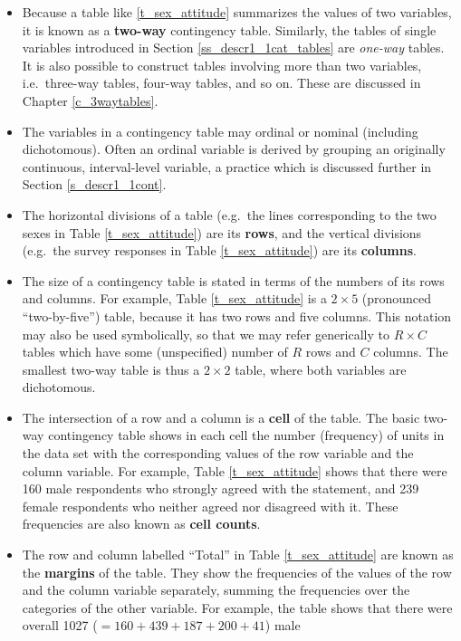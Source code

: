 \begin{itemize}
\item
Because a table like \ref{t_sex_attitude}
summarizes the values of two variables, it is known as a
\textbf{two-way} contingency table.
Similarly, the tables of single variables
introduced in Section \ref{ss_descr1_1cat_tables} are \emph{one-way}
tables. It is also possible to construct tables involving more than two
variables, i.e.\ three-way tables, four-way tables, and so on. These are
discussed in Chapter \ref{c_3waytables}.
\item
The variables in a contingency table may ordinal or nominal
(including dichotomous). Often an ordinal variable is derived by grouping an
originally continuous, interval-level variable, a practice which is discussed
further in Section \ref{s_descr1_1cont}.
\item
The horizontal divisions of a table (e.g.\ the lines corresponding to
the two sexes in Table \ref{t_sex_attitude}) are its \textbf{rows}, and the
vertical divisions (e.g.\ the survey responses in Table
\ref{t_sex_attitude}) are its \textbf{columns}.
\item
The size of a contingency table is stated in terms of the numbers of its rows
and columns. For example, Table \ref{t_sex_attitude} is a $2\times
5$ (pronounced ``two-by-five'') table, because it has two rows and
five columns. This notation may also be used symbolically, so that we may refer
generically to $R\times C$ tables which have some (unspecified) number
of $R$ rows and $C$ columns.
The smallest two-way table is thus a $2\times 2$ table, where both
variables are dichotomous.
\item
The intersection of a row and a column is a \textbf{cell} of the table.
The basic two-way contingency table shows in each cell the number
(frequency) of units in the data set with the corresponding values of
the row variable and the column variable. For example, Table
\ref{t_sex_attitude} shows that there were 160 male respondents who
strongly agreed with the statement, and 239 female respondents who
neither agreed nor disagreed with it. These frequencies are also known as \textbf{cell
counts}.
\item
The row and column labelled ``Total'' in Table \ref{t_sex_attitude} are
known as the \textbf{margins} of the table. They show the frequencies of
the values of the row and the column variable separately, summing the
frequencies over the categories of the other variable. For example, the
table shows that there were overall 1027 ($=160+439+187+200+41$) male

\end{itemize}
